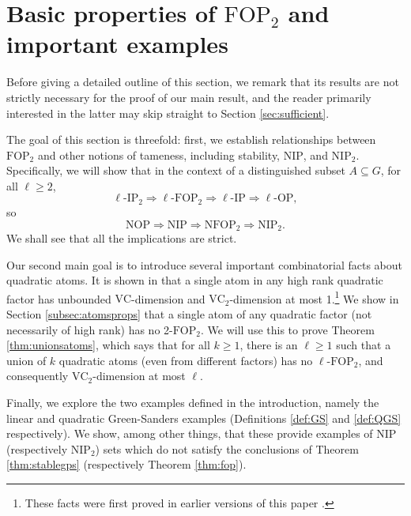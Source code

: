 \documentclass[12pt,oneside,british,a4wide]{amsart}
\numberwithin{equation}{section}
\theoremstyle{definition}
\def\OP{\mathrm{OP}}
\def\NOP{\mathrm{NOP}}
\def\FOP{\mathrm{FOP}}
\def\NFOP{\mathrm{NFOP}}
\def\IP{\mathrm{IP}}
\def\NIP{\mathrm{NIP}}
\def\VC{\mathrm{VC}}
\begin{document}
\section{Basic properties of $\FOP_2$ and important examples}\label{sec:context}

Before giving a detailed outline of this section, we remark that its results are not strictly necessary for the proof of our main result, and the reader primarily interested in the latter may skip straight to Section \ref{sec:sufficient}. 

The goal of this section is threefold: first, we establish relationships between $\FOP_2$ and other notions of tameness, including stability, $\NIP$, and $\NIP_2$. Specifically, we will show that in the context of a distinguished subset $A\subseteq G$, for all $\ell\geq 2$,
\[\ell\mbox{-}\IP_2\Rightarrow \ell\mbox{-}\FOP_2\Rightarrow \ell\mbox{-}\IP\Rightarrow \ell\mbox{-}\OP,\]
so
\[\NOP\Rightarrow \NIP\Rightarrow \NFOP_2\Rightarrow \NIP_2.\]
We shall see that all the implications are strict.

Our second main goal is to introduce several important combinatorial facts about quadratic atoms. It is shown in \cite[Lemmas 3.9 and 3.10]{Terry.2021d} that a single atom in any high rank quadratic factor has unbounded $\VC$-dimension and $\VC_2$-dimension at most 1.\footnote{These facts were first proved in earlier versions of this paper \cite[Example 5.1 and Corollary 5.8]{Terry.2021av2}.} We show in Section \ref{subsec:atomsprops} that a single atom of any quadratic factor (not necessarily of high rank) has no 2-$\FOP_2$. We will use this to prove Theorem \ref{thm:unionsatoms}, which says that for all $k\geq 1$, there is an $\ell\geq 1$ such that a union of $k$ quadratic atoms (even from different factors) has no $\ell$-$\FOP_2$, and consequently $\VC_2$-dimension at most $\ell$.

Finally, we explore the two examples defined in the introduction, namely the linear and quadratic Green-Sanders examples (Definitions \ref{def:GS} and \ref{def:QGS} respectively). We show, among other things, that these provide examples of NIP (respectively $\NIP_2$) sets which do not satisfy the conclusions of Theorem \ref{thm:stablegps} (respectively Theorem \ref{thm:fop}). 
\end{document}
